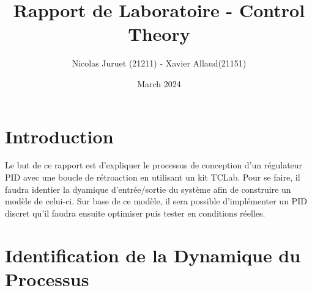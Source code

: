\documentclass{article}
\title{Rapport de Laboratoire - Control Theory}
\author{Nicolas Juruet (21211) - Xavier Allaud(21151)}
\date{March 2024}
\begin{document}
\maketitle

\section{Introduction}
Le but de ce rapport est d'expliquer le processus de conception d'un régulateur PID avec une boucle de rétroaction en utilisant un kit TCLab. Pour se faire, il faudra identier la dyamique d'entrée/sortie du système afin de construire un modèle de celui-ci. Sur base de ce modèle, il sera possible d'implémenter un PID discret qu'il faudra ensuite optimiser puis tester en conditions réelles.
\tableofcontents

\newpage

\section{Identification de la Dynamique du Processus}
\end{document}
